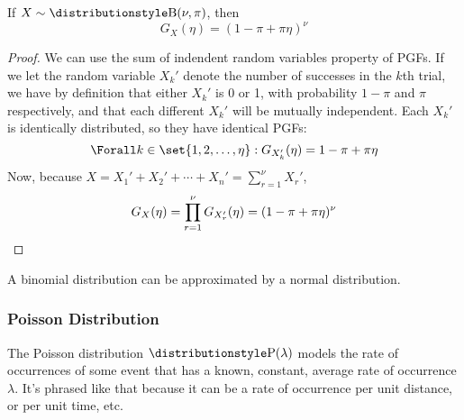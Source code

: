 \begin{lemma} \label{lem_binom_pgf}
If \(X \sim \Binomial(\nu, \pi)\), then
\begin{equation*}
G_X(\eta) = (1 - \pi + \pi \eta)^\nu
\end{equation*}
\end{lemma}
\begin{proof}
We can use the sum of indendent random variables property of PGFs. If we let the
random variable \(X_k'\) denote the number of successes in the \(k\)th trial, we
have by definition that either \(X_k'\) is 0 or 1, with probability \(1 - \pi\)
and \(\pi\) respectively, and that each different \(X_k'\) will be mutually
independent. Each \(X_k'\) is identically distributed, so they have identical
PGFs:
\begin{equation*}
\Forall k \in \set{1, 2, \dotsc, \eta}: G_{X_k'}(\eta) = 1 - \pi + \pi \eta
\end{equation*}
Now, because \(X = X_1' + X_2' + \dotsb + X_n' = \sum_{r = 1}^\nu X_r'\),
\begin{equation*}
G_X(\eta) = \prod_{r = 1}^\nu G_{X_r'}(\eta)
    = (1 - \pi + \pi \eta)^\nu \qedhere
\end{equation*}
\end{proof}

A binomial distribution can be approximated by a normal distribution.

\subsubsection{Poisson Distribution}

The Poisson distribution \(\Poisson(\lambda)\) models the rate of occurrences of
some event that has a known, constant, average rate of occurrence \(\lambda\).
It's phrased like that because it can be a rate of occurrence per unit distance,
or per unit time, etc.

